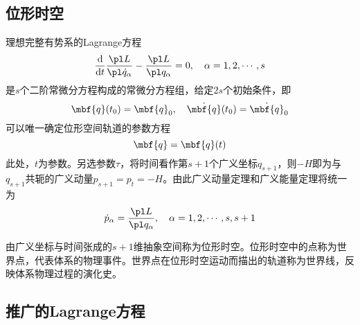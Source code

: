 \subsection{位形时空}

理想完整有势系的Lagrange方程
\begin{equation}
	\frac{\mathrm{d}}{\mathrm{d} t} \frac{\pl L}{\pl \dot{q}_\alpha} - \frac{\pl L}{\pl q_\alpha} = 0,\quad \alpha = 1,2,\cdots,s
\end{equation}
是$s$个二阶常微分方程构成的常微分方程组，给定$2s$个初始条件，即
\begin{equation*}
	\mbf{q}(t_0) = \mbf{q}_0,\quad \dot{\mbf{q}}(t_0) = \dot{\mbf{q}}_0
\end{equation*}
可以唯一确定位形空间轨道的参数方程
\begin{equation*}
	\mbf{q} = \mbf{q}(t)
\end{equation*}
此处，$t$为参数。另选参数$\tau$，将时间看作第$s+1$个广义坐标$q_{s+1}$，则$-H$即为与$q_{s+1}$共轭的广义动量$p_{s+1} = p_t = -H$。由此广义动量定理和广义能量定理将统一为
\begin{equation*}
	\dot{p}_\alpha = \frac{\pl L}{\pl q_\alpha},\quad \alpha = 1,2,\cdots,s,s+1
\end{equation*}

由广义坐标与时间张成的$s+1$维抽象空间称为{\heiti 位形时空}。位形时空中的点称为{\heiti 世界点}，代表体系的物理事件。世界点在位形时空运动而描出的轨道称为{\heiti 世界线}，反映体系物理过程的演化史。

\subsection{推广的Lagrange方程}

